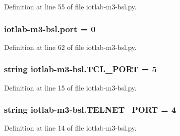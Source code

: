 Definition at line 55 of file iotlab-\/m3-\/bsl.\+py.

\subsubsection[{\texorpdfstring{port}{port}}]{\setlength{\rightskip}{0pt plus 5cm}iotlab-\/m3-\/bsl.\+port = \textquotesingle{}0\textquotesingle{}}\hypertarget{namespaceiotlab-m3-bsl_a21fae930582aa936b8c4de1f9723b0a4}{}\label{namespaceiotlab-m3-bsl_a21fae930582aa936b8c4de1f9723b0a4}


Definition at line 62 of file iotlab-\/m3-\/bsl.\+py.

\subsubsection[{\texorpdfstring{T\+C\+L\+\_\+\+P\+O\+RT}{TCL_PORT}}]{\setlength{\rightskip}{0pt plus 5cm}string iotlab-\/m3-\/bsl.\+T\+C\+L\+\_\+\+P\+O\+RT = \textquotesingle{}5\textquotesingle{}}\hypertarget{namespaceiotlab-m3-bsl_a8b83da64b05c2868d96b8f561197fb92}{}\label{namespaceiotlab-m3-bsl_a8b83da64b05c2868d96b8f561197fb92}


Definition at line 15 of file iotlab-\/m3-\/bsl.\+py.

\subsubsection[{\texorpdfstring{T\+E\+L\+N\+E\+T\+\_\+\+P\+O\+RT}{TELNET_PORT}}]{\setlength{\rightskip}{0pt plus 5cm}string iotlab-\/m3-\/bsl.\+T\+E\+L\+N\+E\+T\+\_\+\+P\+O\+RT = \textquotesingle{}4\textquotesingle{}}\hypertarget{namespaceiotlab-m3-bsl_a68381e104d1b125d86d5f6f80f393eb3}{}\label{namespaceiotlab-m3-bsl_a68381e104d1b125d86d5f6f80f393eb3}


Definition at line 14 of file iotlab-\/m3-\/bsl.\+py.

